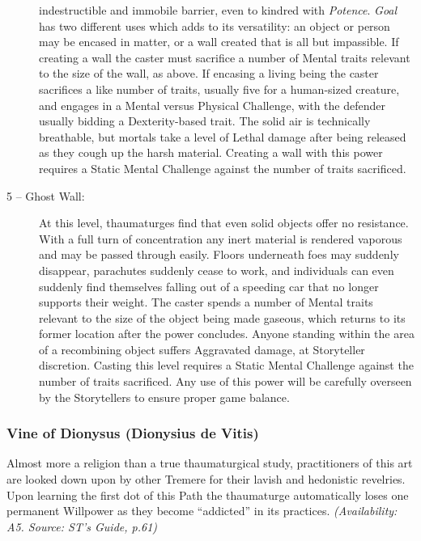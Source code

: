 \begin{description}
	indestructible and immobile barrier, even to kindred with \emph{Potence}.  \emph{Goal} has two different uses 
	which adds to its versatility:  an object or person may be encased in matter, or a wall created that is all but 
	impassible.  If creating a wall the caster must sacrifice a number of Mental traits relevant to the size of the wall, 
	as above.  If encasing a living being the caster sacrifices a like number of traits, usually five for a human-sized 
	creature, and engages in a Mental versus Physical Challenge, with the defender usually bidding a Dexterity-based trait.  
	The solid air is technically breathable, but mortals take a level of Lethal damage after being released as they cough 
	up the harsh material.  Creating a wall with this power requires a Static Mental Challenge against the number of traits 
	sacrificed.
	\item[5 -- Ghost Wall:]  At this level, thaumaturges find that even solid objects offer no resistance.  With 
	a full turn of concentration any inert material is rendered vaporous and may be passed through easily.  Floors underneath 
	foes may suddenly disappear, parachutes suddenly cease to work, and individuals can even suddenly find themselves falling 
	out of a speeding car that no longer supports their weight.  The caster spends a number of Mental traits relevant to 
	the size of the object being made gaseous, which returns to its former location after the power concludes.  Anyone standing 
	within the area of a recombining object suffers Aggravated damage, at Storyteller discretion.  Casting this level requires 
	a Static Mental Challenge against the number of traits sacrificed.  Any use of this power will be carefully overseen by the 
	Storytellers to ensure proper game balance.
\end{description}

\subsubsection{Vine of Dionysus (Dionysius de Vitis)}
Almost more a religion than a true thaumaturgical study, practitioners of this art are looked down upon by other 
Tremere for their lavish and hedonistic revelries.  Upon learning the first dot of this Path the thaumaturge automatically 
loses one permanent Willpower as they become ``addicted'' in its practices.  \emph{(Availability:  A5.  Source:  ST's Guide, p.61)}

